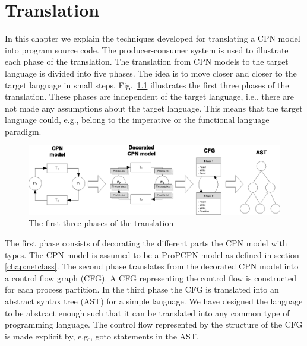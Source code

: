\chapter{Translation}
\label{chap:translation}
In this chapter we explain the techniques developed for translating a CPN model into program source code. The producer-consumer system is used to illustrate each phase of the translation. The translation from CPN models to the target language is divided into five phases. The idea is to move closer and closer to the target language in small steps. Fig.~\ref{fig:translationphases123} illustrates the first three phases of the translation. These phases are independent of the target language, i.e., there are not made any assumptions about the target language. This means that the target language could, e.g., belong to the imperative or the functional language paradigm.

\begin{figure}[h!]
\centering
\includegraphics[width=\textwidth]{translation/graphics/phasesfigure01.eps}
\caption{The first three phases of the translation}
\label{fig:translationphases123}
\end{figure}

The first phase consists of decorating the different parts the CPN model with types. The CPN model is assumed to be a ProPCPN model as defined in section \ref{chap:netclass}. The second phase translates from the decorated CPN model into a control flow graph (CFG). A CFG representing the control flow is constructed for each process partition. In the third phase the CFG is translated into an abstract syntax tree (AST) for a simple language. We have designed the language to be abstract enough such that it can be translated into any common type of programming language. The control flow represented by the structure of the CFG is made explicit by, e.g., goto statements in the AST. 

